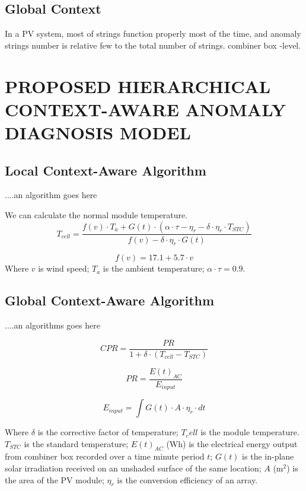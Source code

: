 \documentclass[journal]{IEEEtran}
\begin{document}
\subsection{Global Context}
In a PV system, most of strings function properly most of the time, and anomaly strings number is relative few to the total number of strings. combiner box -level.

\section{PROPOSED HIERARCHICAL CONTEXT-AWARE ANOMALY DIAGNOSIS MODEL}
\label{sctn:mdl}
\subsection{Local Context-Aware Algorithm}
....an algorithm goes here

We can calculate the normal module temperature.
\begin{equation}
\label{eqn:Tcell}
T_{cell}= \frac{f(v)\cdot T_a +G(t) \cdot (\alpha \cdot \tau -\eta_r -\delta \cdot \eta_r \cdot T_{STC})}{f(v)-\delta\cdot \eta_r\cdot G(t)}
\end{equation}

\begin{equation}
\label{eqn:fv}
f(v)=17.1+5.7\cdot v
\end{equation}
Where $v$ is wind speed; $T_a$ is the ambient temperature; $\alpha \cdot \tau =0.9$.
\subsection{Global Context-Aware Algorithm}
....an algorithms goes here

\begin{equation}
\label{eqn:input}
CPR= \frac{PR}{1+\delta \cdot (T_{cell}-T_{STC})}
\end{equation}

\begin{equation}
\label{eqn:pr}
PR=\frac{E(t)_{AC}}{E_{input}}
\end{equation}

\begin{equation}
\label{eqn:input}
E_{input}= \int G(t)\cdot A \cdot \eta_r \cdot dt
\end{equation}

Where $\delta$ is the corrective factor of temperature; $T_cell$ is the module temperature. $T_{STC}$ is the standard temperature; $E(t)_{AC}$ (Wh) is the electrical energy output from combiner box recorded over a time minute period $t$; $G(t)$ is the in-plane solar irradiation received on an unshaded surface of the same location; $A$ (m$^2$) is the area of the PV module; $\eta_r$ is the conversion efficiency of an array.
\end{document}
